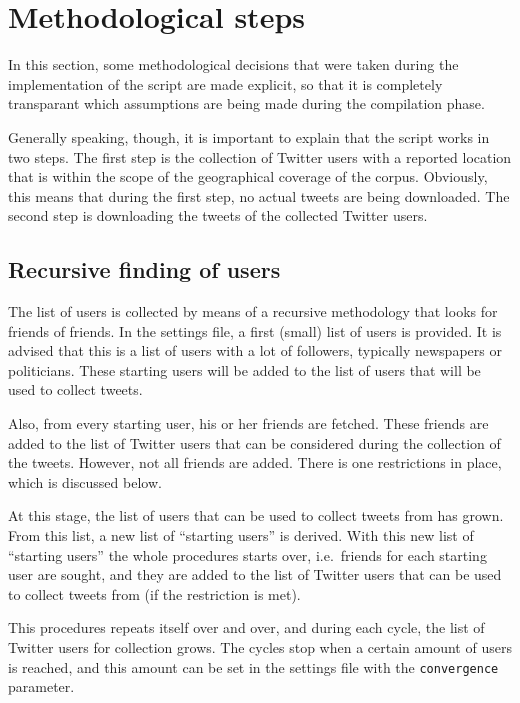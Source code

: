 \documentclass[a4paper,11pt]{article}
\begin{document}
\section{Methodological steps}

In this section, some methodological decisions that were taken during the implementation of the script are made explicit, so that it is completely transparant which assumptions are being made during the compilation phase.

Generally speaking, though, it is important to explain that the script works in two steps. The first step is the collection of Twitter users with a reported location that is within the scope of the geographical coverage of the corpus. Obviously, this means that during the first step, no actual tweets are being downloaded. The second step is downloading the tweets of the collected Twitter users.

\subsection{Recursive finding of users}

The list of users is collected by means of a recursive methodology that looks for friends of friends. In the settings file, a first (small) list of users is provided. It is advised that this is a list of users with a lot of followers, typically newspapers or politicians. These starting users will be added to the list of users that will be used to collect tweets.

Also, from every starting user, his or her friends are fetched. These friends are added to the list of Twitter users that can be considered during the collection of the tweets. However, not all friends are added. There is one restrictions in place, which is discussed below.

At this stage, the list of users that can be used to collect tweets from has grown. From this list, a new list of ``starting users'' is derived. With this new list of ``starting users'' the whole procedures starts over, i.e.~friends for each starting user are sought, and they are added to the list of Twitter users that can be used to collect tweets from (if the restriction is met).

This procedures repeats itself over and over, and during each cycle, the list of Twitter users for collection grows. The cycles stop when a certain amount of users is reached, and this amount can be set in the settings file with the \texttt{convergence} parameter.
\end{document}
